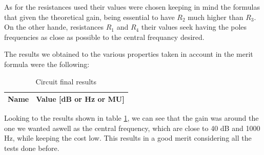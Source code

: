 \par As for the resistances used their values were chosen keeping in mind the formulas that given the theoretical gain, being essential to have $R_{2}$ much higher than
${R_3}$. 
On the other hande, resistances ${R_1}$ and ${R_4}$ their values seek having the poles frequencies as close as possible to the central frequancy desired.

The results we obtained to the various properties taken in account in the merit formula were the following:

\begin{table}[h]
  \centering
  \begin{tabular}{|l|r|}
    \hline    
    {\bf Name} & {\bf Value [dB or Hz or MU]} \\ \hline
    
 	\end{tabular}
  	\caption{Circuit final results}
 	 \label{tab:merit1}
	\end{table} 

\par Looking to the results shown in table \ref{tab:merit1}, we can see that the gain was around the one we wanted aswell as the central frequency, which are close to 40 dB and 1000 Hz, while keeping the 
cost low. This results in a good merit considering all the tests done before. 

























